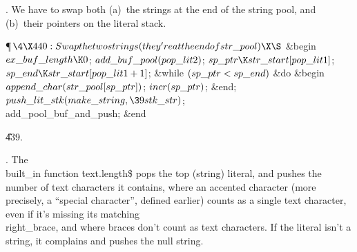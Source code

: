 .
We have to swap both (a)~the strings at the end of the string pool,
and (b)~their pointers on the literal stack.

\Y\P$\4\X440:Swap the two strings (they're at the end of \\{str\_pool})\X\S$\6
\&{begin} $\\{ex\_buf\_length}\K0$;\5
$\\{add\_buf\_pool}(\\{pop\_lit2})$;\6
$\\{sp\_ptr}\K\\{str\_start}[\\{pop\_lit1}]$;\5
$\\{sp\_end}\K\\{str\_start}[\\{pop\_lit1}+1]$;\6
\&{while} $(\\{sp\_ptr}<\\{sp\_end})$ \1\&{do}\6
\&{begin} $\\{append\_char}(\\{str\_pool}[\\{sp\_ptr}])$;\5
$\\{incr}(\\{sp\_ptr})$;\6
\&{end};\2\6
$\\{push\_lit\_stk}(\\{make\_string},\39\\{stk\_str})$;\6
\\{add\_pool\_buf\_and\_push};\6
\&{end}\par
\U439.\fi

.
The \\{built\_in} function {\.{text.length\$}} pops the top (string)
literal, and pushes the number of text characters it contains, where
an accented character (more precisely, a ``special character''$\!$,
defined earlier) counts as a single text character, even if it's
missing its matching \\{right\_brace}, and where braces don't count as
text characters.  If the literal isn't a string, it complains and
pushes the null string.

